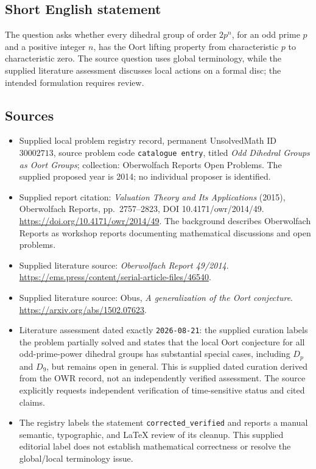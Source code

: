 \documentclass[11pt]{article}
\begin{document}
\subsection{Short English statement}
The question asks whether every dihedral group of order \(2p^n\), for an odd prime \(p\) and a positive integer \(n\), has the Oort lifting property from characteristic \(p\) to characteristic zero. The source question uses global terminology, while the supplied literature assessment discusses local actions on a formal disc; the intended formulation requires review.
\subsection{Sources}
\begin{itemize}
\item Supplied local problem registry record, permanent UnsolvedMath ID \(30002713\), source problem code \texttt{catalogue entry}, titled \emph{Odd Dihedral Groups as Oort Groups}; collection: Oberwolfach Reports Open Problems. The supplied proposed year is 2014; no individual proposer is identified.
\item Supplied report citation: \emph{Valuation Theory and Its Applications} (2015), Oberwolfach Reports, pp.~2757--2823, DOI 10.4171/owr/2014/49. \url{https://doi.org/10.4171/owr/2014/49}. The background describes Oberwolfach Reports as workshop reports documenting mathematical discussions and open problems.
\item Supplied literature source: \emph{Oberwolfach Report 49/2014}. \url{https://ems.press/content/serial-article-files/46540}.
\item Supplied literature source: Obus, \emph{A generalization of the Oort conjecture}. \url{https://arxiv.org/abs/1502.07623}.
\item Literature assessment dated exactly \texttt{2026-08-21}: the supplied curation labels the problem partially solved and states that the local Oort conjecture for all odd-prime-power dihedral groups has substantial special cases, including \(D_p\) and \(D_9\), but remains open in general. This is supplied dated curation derived from the OWR record, not an independently verified assessment. The source explicitly requests independent verification of time-sensitive status and cited claims.
\item The registry labels the statement \texttt{corrected\_verified} and reports a manual semantic, typographic, and LaTeX review of its cleanup. This supplied editorial label does not establish mathematical correctness or resolve the global/local terminology issue.
\end{itemize}
\end{document}
